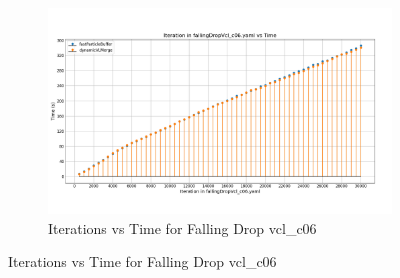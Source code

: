 \begin{figure}[H]\ContinuedFloat
\centering
\begin{subfigure}{\linewidth}
    \centering
    \includegraphics[width=\linewidth]{graphs/fallingDrop/normalExperiments/iter/vclc06.png}
    \caption{Iterations vs Time for Falling Drop vcl\_c06}
    \label{fig:constantVelocityCube}
\end{subfigure}
\end{figure}

